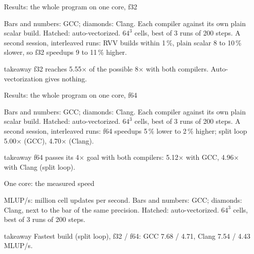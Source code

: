 \documentclass[aspectratio=169,10pt,t]{beamer}
\newcommand{\sx}[1]{#1\ensuremath{\times}} %
\newcommand{\takeaway}[1]{\par\vfill
  \begin{beamercolorbox}[wd=\textwidth,sep=4pt,rounded=true]{takeaway}
    \small #1
  \end{beamercolorbox}}
\begin{document}
\begin{frame}{Results: the whole program on one core, f32}
  \vspace{1mm}
  \centering

  \vspace{0.5mm}
  {\scriptsize\color{psgray}Bars and numbers: GCC; diamonds: Clang. Each compiler against its own plain
  scalar build. Hatched: auto-vectorized. $64^3$ cells, best of 3 runs of 200 steps. A second session,
  interleaved runs: RVV builds within 1\,\%, plain scalar 8 to 10\,\% slower, so f32 speedups 9 to 11\,\% higher.\par}
  \takeaway{f32 reaches \sx{5.55} of the possible \sx{8} with both compilers. Auto-vectorization gives
    nothing.}
\end{frame}

\begin{frame}{Results: the whole program on one core, f64}
  \vspace{1mm}
  \centering

  \vspace{0.5mm}
  {\scriptsize\color{psgray}Bars and numbers: GCC; diamonds: Clang. Each compiler against its own plain
  scalar build. Hatched: auto-vectorized. $64^3$ cells, best of 3 runs of 200 steps. A second session,
  interleaved runs: f64 speedups 5\,\% lower to 2\,\% higher; split loop \sx{5.00} (GCC), \sx{4.70} (Clang).\par}
  \takeaway{f64 passes its \sx{4} goal with both compilers: \sx{5.12} with GCC, \sx{4.96} with Clang
    (split loop).}
\end{frame}

\begin{frame}{One core: the measured speed}
  \vspace{1mm}
  \centering

  \vspace{0.5mm}
  {\scriptsize\color{psgray}MLUP/s: million cell updates per second. Bars and numbers: GCC; diamonds:
  Clang, next to the bar of the same precision. Hatched: auto-vectorized. $64^3$ cells, best of 3 runs
  of 200 steps.\par}
  \takeaway{Fastest build (split loop), f32 / f64: GCC 7.68 / 4.71, Clang 7.54 / 4.43 MLUP/s.}
\end{frame}
\end{document}
